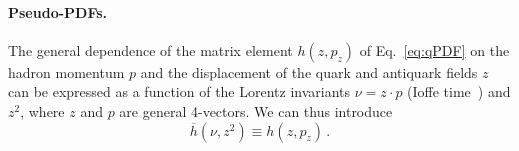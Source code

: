 
\paragraph*{Pseudo-PDFs.} 
The general dependence of the  matrix element $h(z,p_z)$ of Eq.~\eqref{eq:qPDF} 
on the hadron momentum $p$ and the displacement of the quark and antiquark 
fields $z$ can be expressed as a function of the Lorentz invariants 
$\nu=z\cdot p$ (Ioffe time~\cite{Ioffe:1969kf,Braun:1994jq}) 
and $z^2$, where $z$ and $p$ are general 4-vectors.  
%
We can thus introduce
\begin{equation}
\overline{h}(\nu,z^2) \equiv h(z,p_z)\,.
\end{equation}

